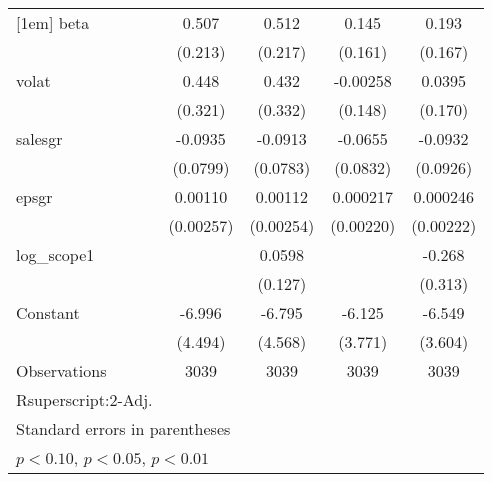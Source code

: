 {\begin{tabular}{l*{4}{c}}
[1em]
beta                &       0.507\sym{**} &       0.512\sym{**} &       0.145         &       0.193         \\
                    &     (0.213)         &     (0.217)         &     (0.161)         &     (0.167)         \\
[1em]
volat               &       0.448         &       0.432         &    -0.00258         &      0.0395         \\
                    &     (0.321)         &     (0.332)         &     (0.148)         &     (0.170)         \\
[1em]
salesgr             &     -0.0935         &     -0.0913         &     -0.0655         &     -0.0932         \\
                    &    (0.0799)         &    (0.0783)         &    (0.0832)         &    (0.0926)         \\
[1em]
epsgr               &     0.00110         &     0.00112         &    0.000217         &    0.000246         \\
                    &   (0.00257)         &   (0.00254)         &   (0.00220)         &   (0.00222)         \\
[1em]
log\_scope1          &                     &      0.0598         &                     &      -0.268         \\
                    &                     &     (0.127)         &                     &     (0.313)         \\
[1em]
Constant            &      -6.996         &      -6.795         &      -6.125         &      -6.549\sym{*}  \\
                    &     (4.494)         &     (4.568)         &     (3.771)         &     (3.604)         \\
\hline
Observations        &        3039         &        3039         &        3039         &        3039         \\
R{superscript:2}-Adj.&                     &                     &                     &                     \\
\hline\hline
\multicolumn{5}{l}{\footnotesize Standard errors in parentheses}\\
\multicolumn{5}{l}{\footnotesize \sym{*} \(p<0.10\), \sym{**} \(p<0.05\), \sym{***} \(p<0.01\)}\\
\end{tabular}
}
